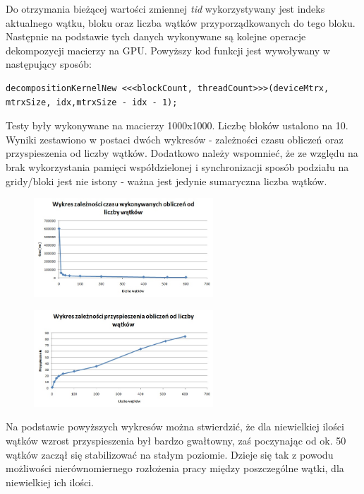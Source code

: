 \documentclass[a4paper,12pt]{article}
\begin{document}
Do otrzymania bieżącej wartości zmiennej \textit{tid} wykorzystywany jest indeks aktualnego wątku, bloku oraz liczba wątków przyporządkowanych do tego bloku. Następnie na podstawie tych danych wykonywane są kolejne operacje dekompozycji macierzy na GPU. Powyższy kod funkcji jest wywoływany w następujący sposób:

\begin{lstlisting}
decompositionKernelNew <<<blockCount, threadCount>>>(deviceMtrx, mtrxSize, idx,mtrxSize - idx - 1);
\end{lstlisting}

Testy były wykonywane na macierzy 1000x1000. Liczbę bloków ustalono na 10. Wyniki zestawiono w postaci dwóch wykresów - zależności czasu obliczeń oraz przyspieszenia od liczby wątków. Dodatkowo należy wspomnieć, że ze względu na brak wykorzystania pamięci współdzielonej i synchronizacji sposób podziału na gridy/bloki jest nie istony - ważna jest jedynie sumaryczna liczba wątków.

\begin{figure}[!h]
	\centering
  \includegraphics[width=0.6\textwidth]{1.jpg}
\end{figure}

\begin{figure}[!h]
	\centering
  \includegraphics[width=0.6\textwidth]{2.jpg}
\end{figure}

\vspace{10cm}
Na podstawie powyższych wykresów można stwierdzić, że dla niewielkiej ilości wątków wzrost przyspieszenia był bardzo gwałtowny, zaś poczynając od ok. 50 wątków zaczął się stabilizować na stałym poziomie. Dzieje się tak z powodu możliwości nierównomiernego rozłożenia pracy między poszczególne wątki, dla niewielkiej ich ilości.
\end{document}
